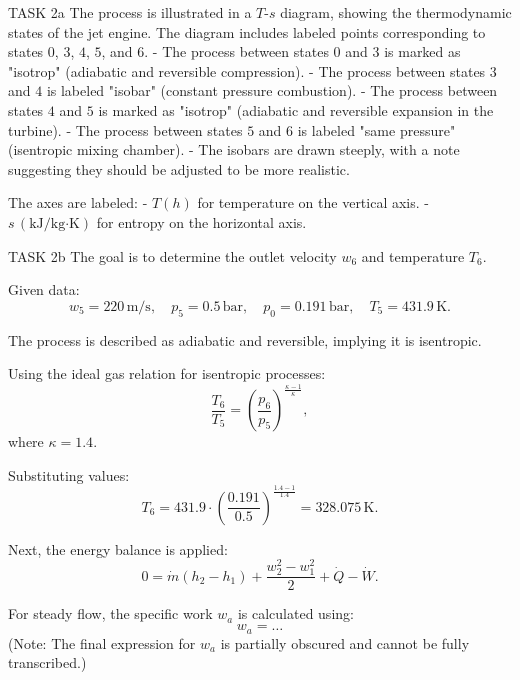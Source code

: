 TASK 2a  
The process is illustrated in a \( T \)-\( s \) diagram, showing the thermodynamic states of the jet engine. The diagram includes labeled points corresponding to states \( 0 \), \( 3 \), \( 4 \), \( 5 \), and \( 6 \).  
- The process between states \( 0 \) and \( 3 \) is marked as "isotrop" (adiabatic and reversible compression).  
- The process between states \( 3 \) and \( 4 \) is labeled "isobar" (constant pressure combustion).  
- The process between states \( 4 \) and \( 5 \) is marked as "isotrop" (adiabatic and reversible expansion in the turbine).  
- The process between states \( 5 \) and \( 6 \) is labeled "same pressure" (isentropic mixing chamber).  
- The isobars are drawn steeply, with a note suggesting they should be adjusted to be more realistic.  

The axes are labeled:  
- \( T(h) \) for temperature on the vertical axis.  
- \( s \, (\text{kJ}/\text{kg·K}) \) for entropy on the horizontal axis.  

TASK 2b  
The goal is to determine the outlet velocity \( w_6 \) and temperature \( T_6 \).  

Given data:  
\[
w_5 = 220 \, \text{m/s}, \quad p_5 = 0.5 \, \text{bar}, \quad p_0 = 0.191 \, \text{bar}, \quad T_5 = 431.9 \, \text{K}.
\]  

The process is described as adiabatic and reversible, implying it is isentropic.  

Using the ideal gas relation for isentropic processes:  
\[
\frac{T_6}{T_5} = \left( \frac{p_6}{p_5} \right)^{\frac{\kappa - 1}{\kappa}},
\]  
where \( \kappa = 1.4 \).  

Substituting values:  
\[
T_6 = 431.9 \cdot \left( \frac{0.191}{0.5} \right)^{\frac{1.4 - 1}{1.4}} = 328.075 \, \text{K}.
\]  

Next, the energy balance is applied:  
\[
0 = \dot{m} \left( h_2 - h_1 \right) + \frac{w_2^2 - w_1^2}{2} + \dot{Q} - \dot{W}.
\]  

For steady flow, the specific work \( w_a \) is calculated using:  
\[
w_a = \dots
\]  
(Note: The final expression for \( w_a \) is partially obscured and cannot be fully transcribed.)  

